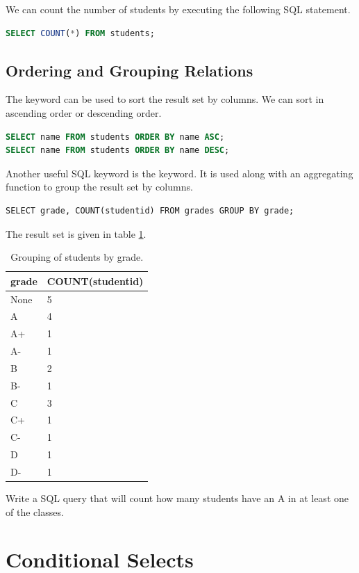 We can count the number of students by executing the following SQL statement.
\begin{lstlisting}[language=SQL]
SELECT COUNT(*) FROM students;
\end{lstlisting}

\subsection*{Ordering and Grouping Relations}
The  keyword can be used to sort the result set by columns.
We can sort in ascending order or descending order.
\begin{lstlisting}[language=SQL]
SELECT name FROM students ORDER BY name ASC;
SELECT name FROM students ORDER BY name DESC;
\end{lstlisting}

Another useful SQL keyword is the  keyword.
It is used along with an aggregating function to group the result set by columns.
\begin{lstlisting}
SELECT grade, COUNT(studentid) FROM grades GROUP BY grade;
\end{lstlisting}
The result set is given in table \ref{table:group_by_grade}.
\begin{table}
\begin{tabular}{|l|l|}
\hline
grade & COUNT(studentid) \\
\hline
None & 5 \\
A & 4 \\
A+ & 1 \\
A- & 1 \\
B & 2 \\
B- & 1 \\
C & 3 \\
C+ & 1 \\
C- & 1 \\
D & 1 \\
D- & 1 \\
\hline
\end{tabular}
\caption{Grouping of students by grade.}
\label{table:group_by_grade}
\end{table}




\begin{problem}
Write a SQL query that will count how many students have an A in at least one of the classes.
\end{problem}




\section*{Conditional Selects}


\let\undefined\lsql 